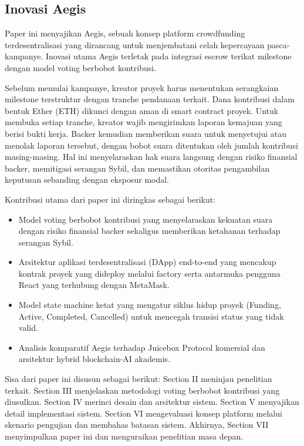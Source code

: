 \documentclass[conference]{IEEEtran}
\begin{document}
\subsection{Inovasi Aegis}
Paper ini menyajikan Aegis, sebuah konsep platform crowdfunding terdesentralisasi yang dirancang untuk menjembatani celah kepercayaan pasca-kampanye. Inovasi utama Aegis terletak pada integrasi escrow terikat milestone dengan model voting berbobot kontribusi.

Sebelum memulai kampanye, kreator proyek harus menentukan serangkaian milestone terstruktur dengan tranche pendanaan terkait. Dana kontribusi dalam bentuk Ether (ETH) dikunci dengan aman di smart contract proyek. Untuk membuka setiap tranche, kreator wajib mengirimkan laporan kemajuan yang berisi bukti kerja. Backer kemudian memberikan suara untuk menyetujui atau menolak laporan tersebut, dengan bobot suara ditentukan oleh jumlah kontribusi masing-masing. Hal ini menyelaraskan hak suara langsung dengan risiko finansial backer, memitigasi serangan Sybil, dan memastikan otoritas pengambilan keputusan sebanding dengan eksposur modal.

Kontribusi utama dari paper ini diringkas sebagai berikut:
\begin{itemize}
	\item Model voting berbobot kontribusi yang menyelaraskan kekuatan suara dengan risiko finansial backer sekaligus memberikan ketahanan terhadap serangan Sybil.
	\item Arsitektur aplikasi terdesentralisasi (DApp) end-to-end yang mencakup kontrak proyek yang dideploy melalui factory serta antarmuka pengguna React yang terhubung dengan MetaMask.
	\item Model state machine ketat yang mengatur siklus hidup proyek (Funding, Active, Completed, Cancelled) untuk mencegah transisi status yang tidak valid.
	\item Analisis komparatif Aegis terhadap Juicebox Protocol komersial dan arsitektur hybrid blockchain-AI akademis.
\end{itemize}

Sisa dari paper ini disusun sebagai berikut: Section II meninjau penelitian terkait. Section III menjelaskan metodologi voting berbobot kontribusi yang diusulkan. Section IV merinci desain dan arsitektur sistem. Section V menyajikan detail implementasi sistem. Section VI mengevaluasi konsep platform melalui skenario pengujian dan membahas batasan sistem. Akhirnya, Section VII menyimpulkan paper ini dan menguraikan penelitian masa depan.
\end{document}
